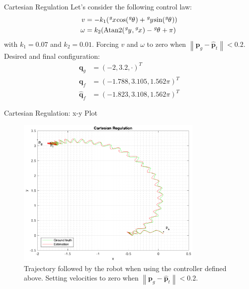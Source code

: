 \documentclass[10pt]{beamer}
\begin{document}
    \begin{frame}{Cartesian Regulation}
        \justifying
        Let's consider the following control law:
        \begin{align*}
            v &= -k_1 (\tensor[^g]{x}{} \text{cos}(\tensor[^g]{\theta}{}) + \tensor[^g]{y}{} \text{sin}(\tensor[^g]{\theta}{})) \\
            \omega &=  k_2 (\text{Atan2}(\tensor[^g]{y}{}, \tensor[^g]{x}{}) - \tensor[^g]{\theta}{} + \pi)
        \end{align*}
        with $k_1 = 0.07$ and $k_2 = 0.01$. Forcing $v$ and $\omega$ to zero when
        $\left\|\bm{p}_g - \bm{\hat{p}}_t \right\| < 0.2$.
        Desired and final configuration:
        \begin{align*}
            \bm{q}_g &= (-2, 3.2, \cdot)^T \\
            \bm{q}_f &= (-1.788, 3.105, 1.562\pi)^T \\
            \bm{\hat{q}}_f &= (-1.823, 3.108, 1.562\pi)^T
        \end{align*}
    \end{frame}

    \begin{frame}{Cartesian Regulation: x-y Plot}
        \begin{figure}
            \caption{Trajectory followed by the robot when using the controller
                defined above. Setting velocities to zero when
                $\left\|\bm{p}_g - \bm{\hat{p}}_t \right\| < 0.2$.}
            \vspace{-0.3cm}
            \includegraphics[width=0.8\textwidth]{images/cartesian_regulation.png}
        \end{figure}
    \end{frame}
\end{document}
